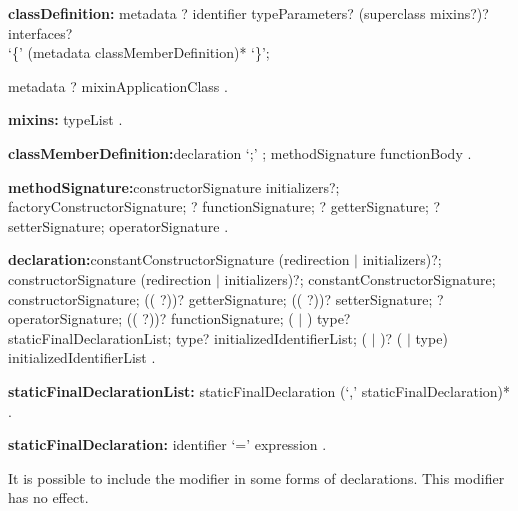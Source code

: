 \documentclass{article}
\begin{document}
\begin{grammar}
{\bf classDefinition:}
metadata \ABSTRACT{}?  \CLASS{} identifier typeParameters? (superclass mixins?)? interfaces? \\
       `\{' (metadata classMemberDefinition)* `\}';

metadata \ABSTRACT{}?  \CLASS{} mixinApplicationClass
    .

{\bf mixins:}
  \WITH{} typeList
  .

{\bf classMemberDefinition:}declaration `{\escapegrammar ;}' ;
       methodSignature functionBody
    .

{\bf methodSignature:}constructorSignature initializers?;
      factoryConstructorSignature;
      \STATIC{}? functionSignature;
      \STATIC{}? getterSignature;
      \STATIC{}? setterSignature;
      operatorSignature
    .

{\bf declaration:}constantConstructorSignature (redirection $|$ initializers)?;
      constructorSignature (redirection $|$ initializers)?;
      \EXTERNAL{} constantConstructorSignature;
      \EXTERNAL{} constructorSignature;
      ((\EXTERNAL{} \STATIC{}?))? getterSignature;
      ((\EXTERNAL{} \STATIC{}?))? setterSignature;
      \EXTERNAL{}? operatorSignature;
      ((\EXTERNAL{} \STATIC{}?))? functionSignature;
      \STATIC{} (\FINAL{} $|$ \CONST{}) type? staticFinalDeclarationList;
      \FINAL{} type? initializedIdentifierList;
      (\STATIC{} $|$ \COVARIANT{})? (\VAR{} $|$ type) initializedIdentifierList
    .

{\bf staticFinalDeclarationList:}
    staticFinalDeclaration (`,' staticFinalDeclaration)*
    .

{\bf staticFinalDeclaration:}
      identifier `=' expression
    .

\end{grammar}

\LMHash{}
It is possible to include the modifier \COVARIANT{} in some forms of declarations.
This modifier has no effect.

\end{document}
